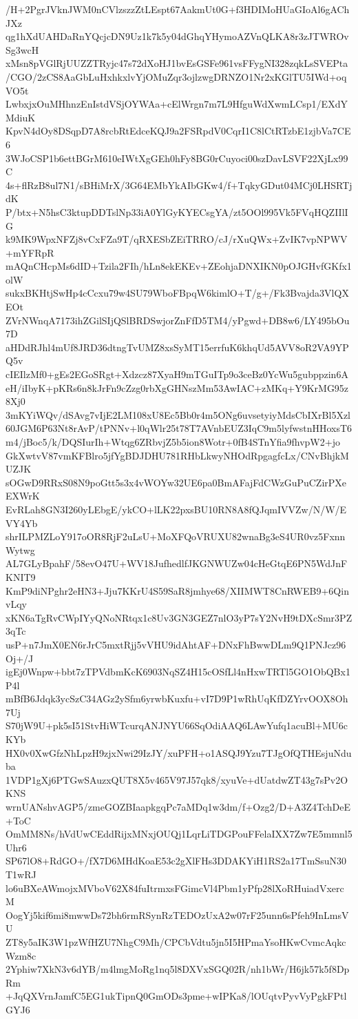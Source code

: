 /H+2PgrJVknJWM0nCVlzszzZtLEspt67AakmUt0G+f3HDIMoHUaGIoAl6gAChJXz
qg1hXdUAHDaRnYQcjcDN9Uz1k7k5y04dGhqYHymoAZVnQLKA8r3zJTWROvSg3wcH
xMsn8pVGlRjUUZZTRyjc47s72dXoHJ1bvEsGSFe961vsFFygNI328zqkLsSVEPta
/CGO/2zCS8AaGbLuHxhkxlvYjOMuZqr3ojlzwgDRNZO1Nr2xKGlTU5IWd+oqVO5t
LwbxjxOuMHhnzEnIstdVSjOYWAa+cElWrgn7m7L9HfguWdXwmLCsp1/EXdYMdiuK
KpvN4dOy8DSqpD7A8rcbRtEdceKQJ9a2FSRpdV0CqrI1C8lCtRTzbE1zjbVa7CE6
3WJoCSP1b6ettBGrM610eIWtXgGEh0hFy8BG0rCuyoci00szDavLSVF22XjLx99C
4s+flRzB8ul7N1/sBHiMrX/3G64EMbYkAIbGKw4/f+TqkyGDut04MCj0LHSRTjdK
P/btx+N5hsC3ktupDDTslNp33iA0YlGyKYECsgYA/zt5OOl995Vk5FVqHQZIIlIG
k9MK9WpxNFZj8vCxFZa9T/qRXESbZEiTRRO/cJ/rXuQWx+ZvIK7vpNPWV+mYFRpR
mAQnCHcpMs6dID+Tzila2FIh/hLn8ekEKEv+ZEohjaDNXIKN0pOJGHvfGKfx1olW
sukxBKHtjSwHp4cCcxu79w4SU79WboFBpqW6kimlO+T/g+/Fk3Bvajda3VlQXEOt
ZVrNWnqA7173ihZGilSIjQSlBRDSwjorZnFfD5TM4/yPgwd+DB8w6/LY495bOu7D
aHDdRJhl4mUf8JRD36dtngTvUMZ8xsSyMT15errfuK6khqUd5AVV8oR2VA9YPQ5v
cIEIlzMf0+gEs2EGoSRgt+Xdzcz87XyaH9mTGuITp9o3ceBz0YcWu5gubppzin6A
eH/iIbyK+pKRs6n8kJrFn9cZzg0rbXgGHNszMm53AwIAC+zMKq+Y9KrMG95z8Xj0
3mKYiWQv/dSAvg7vIjE2LM108xU8Ec5Bb0r4m5ONg6uvsetyiyMdsCbIXrBl5Xzl
60JGM6P63Nt8rAvP/tPNNv+l0qWlr25t78T7AVnbEUZ3IqC9m5lyfwstnHHoxsT6
m4/jBoc5/k/DQSIurIh+Wtqg6ZRbvjZ5b5ion8Wotr+0fB4STnYfia9fhvpW2+jo
GkXwtvV87vmKFBlro5jfYgBDJDHU781RHbLkwyNHOdRpgagfcLx/CNvBhjkMUZJK
sOGwD9RRxS08N9poGtt5s3x4vWOYw32UE6pa0BmAFajFdCWzGuPuCZirPXeEXWrK
EvRLah8GN3I260yLEbgE/ykCO+lLK22pxsBU10RN8A8fQJqmIVVZw/N/W/EVY4Yb
shrILPMZLoY917oOR8RjF2uLsU+MoXFQoVRUXU82wnaBg3eS4UR0vz5FxnnWytwg
AL7GLyBpahF/58evO47U+WV18JufhedlfJKGNWUZw04cHeGtqE6PN5WdJnFKNIT9
KmP9diNPghr2eHN3+Jju7KKrU4S59SaR8jmhye68/XIIMWT8CnRWEB9+6QinvLqy
xKN6aTgRvCWpIYyQNoNRtqx1c8Uv3GN3GEZ7nlO3yP7sY2NvH9tDXcSmr3PZ3qTc
usP+n7JmX0EN6rJrC5mxtRjj5vVHU9idAhtAF+DNxFhBwwDLm9Q1PNJcz96Oj+/J
igEj0Wnpw+bbt7zTPVdbmKcK6903NqSZ4H15cOSfLl4nHxwTRTl5GO1ObQBx1P4l
mBfB6Jdqk3ycSzC34AGz2ySfm6yrwbKuxfu+vI7D9P1wRhUqKfDZYrvOOX8Oh7Uj
S70jW9U+pk5sI51StvHiWTcurqANJNYU66SqOdiAAQ6LAwYufq1acuBl+MU6cKYb
HX0v0XwGfzNhLpzH9zjxNwi29IzJY/xuPFH+o1ASQJ9Yzu7TJgOfQTHEsjuNduba
1VDP1gXj6PTGwSAuzxQUT8X5v465V97J57qk8/xyuVe+dUatdwZT43g7sPv2OKNS
wrnUANshvAGP5/zmeGOZBIaapkgqPc7aMDq1w3dm/f+Ozg2/D+A3Z4TchDeE+ToC
OmMM8Ns/hVdUwCEddRijxMNxjOUQj1LqrLiTDGPouFFelaIXX7Zw7E5mmnl5Uhr6
SP67lO8+RdGO+/fX7D6MHdKoaE53c2gXlFHs3DDAKYiH1RS2a17TmSsuN30T1wRJ
lo6uBXeAWmojxMVboV62X84fuItrmxsFGimcVl4Pbm1yPfp28lXoRHuiadVxercM
OogYj5kif6mi8mwwDs72bh6rmRSynRzTEDOzUxA2w07rF25unn6sPfeh9InLmsVU
ZT8y5aIK3W1pzWfHZU7NhgC9Mh/CPCbVdtu5jn5I5HPmaYsoHKwCvmcAqkcWzm8c
2Yphiw7XkN3v6dYB/m4lmgMoRg1nq5l8DXVxSGQ02R/nh1bWr/H6jk57k5f8DpRm
+JqQXVrnJamfC5EG1ukTipnQ0GmODs3pme+wIPKa8/lOUqtvPyvVyPgkFPtlGYJ6

